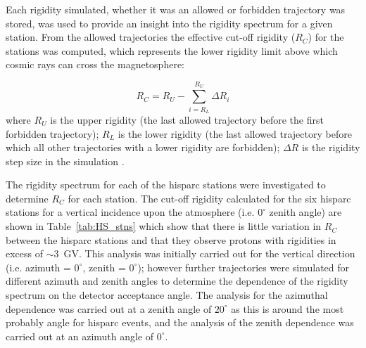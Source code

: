 Each rigidity simulated, whether it was an allowed or forbidden trajectory was stored, was used to provide an insight into the rigidity spectrum for a given station. From the allowed trajectories the effective cut-off rigidity ($R_C$) for the stations was computed, which represents the lower rigidity limit above which cosmic rays can cross the magnetosphere:

\begin{equation}
\label{eq:cut_off}
R_C = R_U - \sum_{i = R_L}^{R_U} \Delta R_i
\end{equation}
%
where $R_U$ is the upper rigidity (the last allowed trajectory before the first forbidden trajectory); $R_L$ is the lower rigidity (the last allowed trajectory before which all other trajectories with a lower rigidity are forbidden); $\Delta R$ is the rigidity step size in the simulation \citep{desorgher_planetocosmics_2005, desorgher_planetocosmics_2006, herbst_influence_2013}.

The rigidity spectrum for each of the \gls{hisparc} stations were investigated to determine $R_C$ for each station. The cut-off rigidity calculated for the six \gls{hisparc} stations for a vertical incidence upon the atmosphere (i.e. $0^\circ$ zenith angle) are shown in Table~\ref{tab:HS_stns} which show that there is little variation in $R_C$ between the \gls{hisparc} stations and that they observe protons with rigidities in excess of $\sim 3$~GV. This analysis was initially carried out for the vertical direction (i.e. azimuth = $0^\circ$, zenith = $0^\circ$); however further trajectories were simulated for different azimuth and zenith angles to determine the dependence of the rigidity spectrum on the detector acceptance angle. The analysis for the azimuthal dependence was carried out at a zenith angle of $20^\circ$ as this is around the most probably angle for \gls{hisparc} events, and the analysis of the zenith dependence was carried out at an azimuth angle of $0^\circ$.


